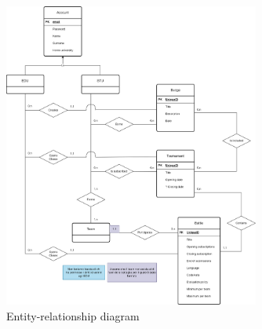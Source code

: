 \begin{figure}[H]
    \centering
    \includegraphics[width=0.75\textwidth]{images/diagrams/er_diagram.png}
    \caption{Entity-relationship diagram}
\end{figure}

